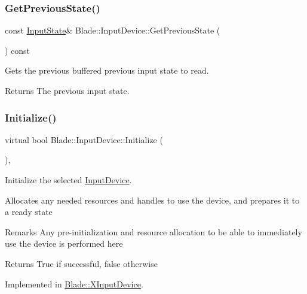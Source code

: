 \subsubsection{\texorpdfstring{Get\+Previous\+State()}{GetPreviousState()}}
{\footnotesize\ttfamily const \hyperlink{struct_blade_1_1_input_state}{Input\+State}\& Blade\+::\+Input\+Device\+::\+Get\+Previous\+State (\begin{DoxyParamCaption}{ }\end{DoxyParamCaption}) const\hspace{0.3cm}{\ttfamily [inline]}}



Gets the previous buffered previous input state to read. 

\begin{DoxyReturn}{Returns}
The previous input state. 
\end{DoxyReturn}
\mbox{\label{class_blade_1_1_input_device_a701823a23160c1e4e169716647d6570b}} 
\subsubsection{\texorpdfstring{Initialize()}{Initialize()}}
{\footnotesize\ttfamily virtual bool Blade\+::\+Input\+Device\+::\+Initialize (\begin{DoxyParamCaption}{ }\end{DoxyParamCaption})\hspace{0.3cm}{\ttfamily [protected]}, {}}



Initialize the selected \hyperlink{class_blade_1_1_input_device}{Input\+Device}. 

Allocates any needed resources and handles to use the device, and prepares it to a ready state \begin{DoxyRemark}{Remarks}
Any pre-\/initialization and resource allocation to be able to immediately use the device is performed here 
\end{DoxyRemark}
\begin{DoxyReturn}{Returns}
True if successful, false otherwise 
\end{DoxyReturn}


Implemented in \hyperlink{class_blade_1_1_x_input_device_af446c4579260d23b0af0a7f4bdfda441}{Blade\+::\+X\+Input\+Device}.

